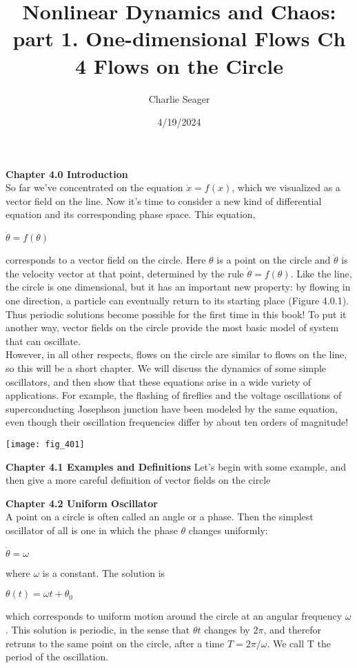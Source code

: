 \documentclass{article}
\newcommand\tab[1][1cm]{\hspace*{#1}}
\begin{document}
\title {Nonlinear Dynamics and Chaos: part 1. One-dimensional Flows Ch 4 Flows on the Circle}

\author{Charlie Seager}

\date{4/19/2024}

\maketitle

\textbf {Chapter 4.0 Introduction} \\ \tab
So far we've concentrated on the equation $\dot{x}=f(x)$, which we visualized as a vector field on the line. Now it's time to consider a new kind of differential equation and its corresponding phase space. This equation,
\begin{center}
$\dot{\theta}=f(\theta)$
\end{center}
corresponds to a vector field on the circle. Here $\theta$ is a point on the circle and $\dot{\theta}$ is the velocity vector at that point, determined by the rule $\dot{\theta}=f(\theta)$. Like the line, the circle is one dimensional, but it has an important new property: by flowing in one direction, a particle can eventually return to its starting place (Figure 4.0.1). Thus periodic solutions become possible for the first time in this book! To put it another way, vector fields on the circle provide the most basic model of system that can oscillate. \\ \tab 
However, in all other respects, flows on the circle are similar to flows on the line, so this will be a short chapter. We will discuss the dynamics of some simple oscillators, and then show that these equations arise in a wide variety of applications. For example, the flashing of fireflies and the voltage oscillations of superconducting Josephson junction have been modeled by the same equation, even though their oscillation frequencies differ by about ten orders of magnitude! 

\texttt{[image: fig\_401]}

\textbf {Chapter 4.1 Examples and Definitions} 
Let's begin with some example, and then give a more careful definition of vector fields on the circle

\textbf {Chapter 4.2 Uniform Oscillator} \\ \tab
A point on a circle is often called an angle or a phase. Then the simplest oscillator of all is one in which the phase $\theta$ changes uniformly:
\begin{center}
$\dot{\theta}=\omega$
\end{center}
where $\omega$ is a constant. The solution is
\begin{center}
$\theta(t)=\omega t + \theta_{0}$
\end{center}
which corresponds to uniform motion around the circle at an angular frequency $\omega$. This solution is periodic, in the sense that $\theta{t}$ changes by $2\pi$, and therefor retruns to the same point on the circle, after a time $T=2\pi/\omega$. We call T the period of the oscillation. \\ \tab
\end{document}

